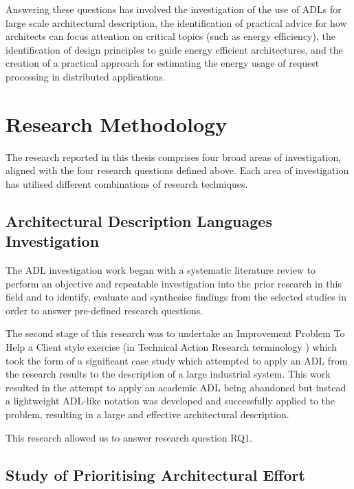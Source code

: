 Answering these questions has involved the investigation of the use of ADLs for large scale architectural description, the identification of practical advice for how architects can focus attention on critical topics (such as energy efficiency), the identification of design principles to guide energy efficient architectures, and the creation of a practical approach for estimating the energy usage of request processing in distributed applications.

\section{Research Methodology}

The research reported in this thesis comprises four broad areas of investigation, aligned with the four research questions defined above.  Each area of investigation has utilised different combinations of research techniques.

\subsection{Architectural Description Languages Investigation}

The ADL investigation work began with a systematic literature review \cite{kitchenham2007-slr} to perform an objective and repeatable investigation into the prior research in this field and to identify, evaluate and synthesise findings from the selected studies in order to answer pre-defined research questions.  

The second stage of this research was to undertake an Improvement Problem To Help a Client style exercise (in Technical Action Research terminology \cite{wieringa2012-tar}) which took the form of a significant case study which attempted to apply an ADL from the research results to the description of a large industrial system.  This work resulted in the attempt to apply an academic ADL being abandoned but instead a lightweight ADL-like notation was developed and successfully applied to the problem, resulting in a large and effective architectural description.

This research allowed us to answer research question RQ1.

\subsection{Study of Prioritising Architectural Effort}


